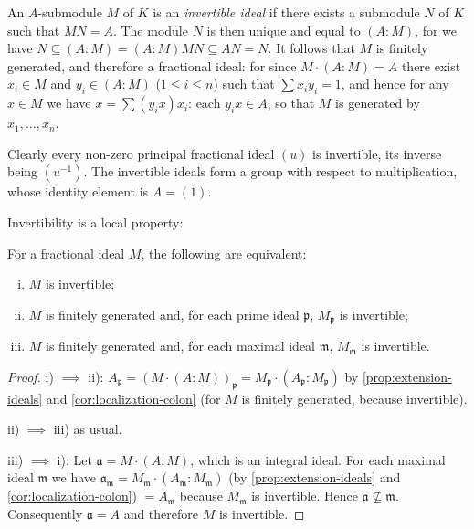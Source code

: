 An $A$-submodule $M$ of $K$ is an \emph{invertible ideal} if there exists a submodule $N$ of $K$ such that $MN = A$. The module $N$ is then unique and equal to $(A : M)$, for we have $N \subseteq (A : M) = (A : M)MN \subseteq AN = N$. It follows that $M$ is finitely generated, and therefore a fractional ideal: for since $M \cdot (A : M) = A$ there exist $x_i \in M$ and $y_i \in (A : M)$ ($1 \leq i \leq n$) such that $\sum x_i y_i = 1$, and hence for any $x \in M$ we have $x = \sum (y_i x)x_i$: each $y_i x \in A$, so that $M$ is generated by $x_1, \ldots, x_n$.

Clearly every non-zero principal fractional ideal $(u)$ is invertible, its inverse being $(u^{-1})$. The invertible ideals form a group with respect to multiplication, whose identity element is $A = (1)$.

Invertibility is a local property:

\begin{proposition}\label{prop:invertible-local}
For a fractional ideal $M$, the following are equivalent:
\begin{enumerate}[i)]
    \item $M$ is invertible;
    \item $M$ is finitely generated and, for each prime ideal $\mathfrak{p}$, $M_{\mathfrak{p}}$ is invertible;
    \item $M$ is finitely generated and, for each maximal ideal $\mathfrak{m}$, $M_{\mathfrak{m}}$ is invertible.
\end{enumerate}
\end{proposition}

\begin{proof}
i) $\implies$ ii): $A_{\mathfrak{p}} = (M \cdot (A:M))_{\mathfrak{p}} = M_{\mathfrak{p}} \cdot (A_{\mathfrak{p}} : M_{\mathfrak{p}})$ by \eqref{prop:extension-ideals} and \eqref{cor:localization-colon} (for $M$ is finitely generated, because invertible).

ii) $\implies$ iii) as usual.

iii) $\implies$ i): Let $\mathfrak{a} = M \cdot (A:M)$, which is an integral ideal. For each maximal ideal $\mathfrak{m}$ we have $\mathfrak{a}_{\mathfrak{m}} = M_{\mathfrak{m}} \cdot (A_{\mathfrak{m}} : M_{\mathfrak{m}})$ (by \eqref{prop:extension-ideals} and \eqref{cor:localization-colon}) $= A_{\mathfrak{m}}$ because $M_{\mathfrak{m}}$ is invertible. Hence $\mathfrak{a} \not\subseteq \mathfrak{m}$. Consequently $\mathfrak{a} = A$ and therefore $M$ is invertible.
\end{proof}

